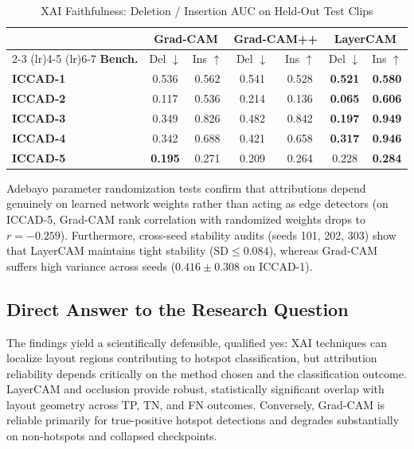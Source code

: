 \documentclass[conference]{IEEEtran}
\begin{document}
\begin{table}[htbp]
\caption{XAI Faithfulness: Deletion / Insertion AUC on Held-Out Test Clips}
\label{tab:faithfulness}
\centering
\setlength{\tabcolsep}{3pt}
\begin{tabular}{lcccccc}
\toprule
 & \multicolumn{2}{c}{\textbf{Grad-CAM}} & \multicolumn{2}{c}{\textbf{Grad-CAM++}} & \multicolumn{2}{c}{\textbf{LayerCAM}} \\
\cmidrule(lr){2-3} \cmidrule(lr){4-5} \cmidrule(lr){6-7}
\textbf{Bench.} & Del $\downarrow$ & Ins $\uparrow$ & Del $\downarrow$ & Ins $\uparrow$ & Del $\downarrow$ & Ins $\uparrow$ \\
\midrule
\textbf{ICCAD-1} & 0.536 & 0.562 & 0.541 & 0.528 & \textbf{0.521} & \textbf{0.580} \\
\textbf{ICCAD-2} & 0.117 & 0.536 & 0.214 & 0.136 & \textbf{0.065} & \textbf{0.606} \\
\textbf{ICCAD-3} & 0.349 & 0.826 & 0.482 & 0.842 & \textbf{0.197} & \textbf{0.949} \\
\textbf{ICCAD-4} & 0.342 & 0.688 & 0.421 & 0.658 & \textbf{0.317} & \textbf{0.946} \\
\textbf{ICCAD-5} & \textbf{0.195} & 0.271 & 0.209 & 0.264 & 0.228 & \textbf{0.284} \\
\bottomrule
\end{tabular}
\end{table}

Adebayo parameter randomization tests confirm that attributions depend genuinely on learned network weights rather than acting as edge detectors (on ICCAD-5, Grad-CAM rank correlation with randomized weights drops to $r = -0.259$). Furthermore, cross-seed stability audits (seeds 101, 202, 303) show that LayerCAM maintains tight stability ($\text{SD} \le 0.084$), whereas Grad-CAM suffers high variance across seeds ($0.416 \pm 0.308$ on ICCAD-1).

\subsection{Direct Answer to the Research Question}
The findings yield a scientifically defensible, qualified yes: XAI techniques can localize layout regions contributing to hotspot classification, but attribution reliability depends critically on the method chosen and the classification outcome. LayerCAM and occlusion provide robust, statistically significant overlap with layout geometry across TP, TN, and FN outcomes. Conversely, Grad-CAM is reliable primarily for true-positive hotspot detections and degrades substantially on non-hotspots and collapsed checkpoints.
\end{document}

